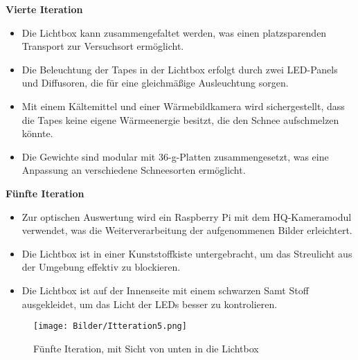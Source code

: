 \textbf{Vierte Iteration}

\begin{itemize}
    \item Die Lichtbox kann zusammengefaltet werden, was einen platzsparenden Transport zur Versuchsort ermöglicht.
    \item Die Beleuchtung der Tapes in der Lichtbox erfolgt durch zwei LED-Panels und Diffusoren, die für eine gleichmäßige Ausleuchtung sorgen.
    \item Mit einem Kältemittel und einer Wärmebildkamera wird sichergestellt, dass die Tapes keine eigene Wärmeenergie besitzt, die den Schnee aufschmelzen könnte.
    \item Die Gewichte sind modular mit 36-g-Platten zusammengesetzt, was eine Anpassung an verschiedene Schneesorten ermöglicht.
\end{itemize}

\textbf{Fünfte Iteration}

\begin{itemize}
    \item Zur optischen Auswertung wird ein Raspberry Pi mit dem HQ-Kameramodul verwendet, was die Weiterverarbeitung der aufgenommenen Bilder erleichtert.
    \item Die Lichtbox ist in einer Kunststoffkiste untergebracht, um das Streulicht aus der Umgebung effektiv zu blockieren.
      \item Die Lichtbox ist auf der Innenseite mit einem schwarzen Samt Stoff ausgekleidet, um das Licht der LEDs besser zu kontrolieren.
\end{itemize}


\begin{figure}
    \centering
    \texttt{[image: Bilder/Itteration5.png]}
    \caption{Fünfte Iteration, mit Sicht von unten in die Lichtbox}
    \label{fig:funfItter}
\end{figure}
